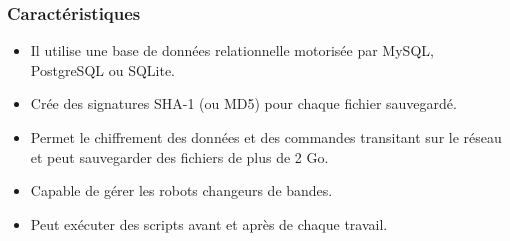 \documentclass[a4paper,11pt]{report}
\begin{document}
\subsubsection{Caractéristiques}
\begin{itemize}
  \item Il utilise une base de données relationnelle motorisée par MySQL, PostgreSQL ou SQLite.
  \item Crée des signatures SHA-1 (ou MD5) pour chaque fichier sauvegardé.
  \item Permet le chiffrement des données et des commandes transitant sur le réseau et peut sauvegarder des fichiers de plus de 2 Go.
  \item Capable de gérer les robots changeurs de bandes.
  \item Peut exécuter des scripts avant et après de chaque travail.
\end{itemize}
\end{document}
